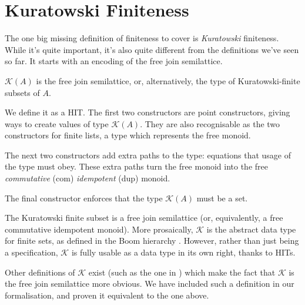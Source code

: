 \section{Kuratowski Finiteness} \label{kuratowski} 
The one big missing definition of finiteness to cover is \emph{Kuratowski}
finiteness.
While it's quite important, it's also quite different from the definitions we've
seen so far.
It starts with an encoding of the free join semilattice.
\begin{definition}
  \(\mathcal{K}(A)\) is the free join semilattice, or, alternatively, the type
  of Kuratowski-finite subsets of \(A\).
  \begin{agdalisting}
  \end{agdalisting}

  We define it as a HIT.
  The first two constructors are point constructors, giving ways to create
  values of type \(\mathcal{K}(A)\).
  They are also recognisable as the two constructors for finite lists, a type
  which represents the free monoid.

  The next two constructors add extra paths to the type: equations that usage of
  the type must obey.
  These extra paths turn the free monoid into the free \emph{commutative} (com)
  \emph{idempotent} (dup) monoid.

  The final constructor enforces that the type \(\mathcal{K}(A)\) must be a set.
\end{definition}
The Kuratowski finite subset is a free join semilattice (or, equivalently, a
free commutative idempotent monoid).
More prosaically, \(\mathcal{K}\) is the abstract data type for finite sets, as
defined in the Boom hierarchy \cite{boomFurtherThoughtsAbstracto1981,
  bunkenburgBoomHierarchy1994}.
However, rather than just being a specification, \(\mathcal{K}\) is fully usable
as a data type in its own right, thanks to HITs.

Other definitions of \(\mathcal{K}\) exist (such as the one in
\cite{fruminFiniteSetsHomotopy2018}) which make the fact that \(\mathcal{K}\) is
the free join semilattice more obvious.
We have included such a definition in our formalisation, and proven it
equivalent to the one above.

